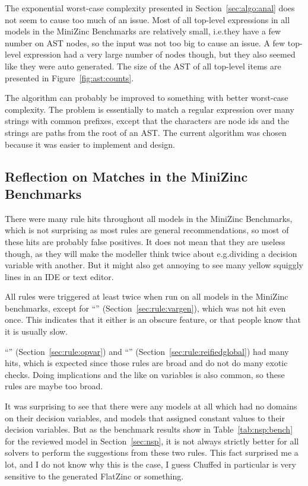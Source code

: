\documentclass[a4paper,12pt]{article}
\newcommand{\ruleref}[1]{``\nameref{sec:rule:#1}'' (Section~\ref{sec:rule:#1})}
\begin{document}
The exponential
worst-case complexity presented in Section~\ref{sec:algo:anal} does not seem to cause too much
of an issue. Most of all top-level expressions in all models in the MiniZinc Benchmarks are
relatively small, i.e.\@ they have a few number on AST nodes,
so the input was not too big to cause an issue.
A few top-level expression had a very large number
of nodes though, but they also seemed like they were auto generated.
The size of the AST of all top-level items are presented in Figure~\ref{fig:ast:counts}.



The algorithm can probably be improved to something with better worst-case complexity. The
problem is essentially to match a regular expression over many strings with common
prefixes, except that the characters are node ids and the strings are paths from the root
of an AST. The current algorithm was chosen because it was easier to implement and design.

\subsection{Reflection on Matches in the MiniZinc Benchmarks}
There were many rule hits throughout all models in the MiniZinc Benchmarks, which is not
surprising as most rules are general recommendations, so most of these hits are probably
false positives. It does not mean that they are useless though, as they will make the
modeller think twice about e.g.\@ dividing a decision variable with another. But it might
also get annoying to see many yellow squiggly lines in an IDE or text editor.

All rules were triggered at least twice when run on all models in the MiniZinc benchmarks,
except for \ruleref{vargen}, which was not hit even once. This indicates that it
either is an obscure feature, or that people know that it is usually slow.

\ruleref{opvar} and \ruleref{reifiedglobal} had many hits,
which is expected since those rules are broad and do not do many exotic checks.
Doing implications and the like on variables is also common, so these rules are maybe too broad.

It was surprising to see that there were any models at all which had no domains on their
decision variables, and models that assigned constant values to their decision variables.
But as the benchmark results show in Table~\ref{tab:nsp:bench} for the reviewed model in
Section~\ref{sec:nsp}, it is not always strictly better for all solvers to perform the
suggestions from these two rules. This fact surprised me a lot, and I do not know why this is the case, I guess
Chuffed in particular is very sensitive to the generated FlatZinc or something.
\end{document}
